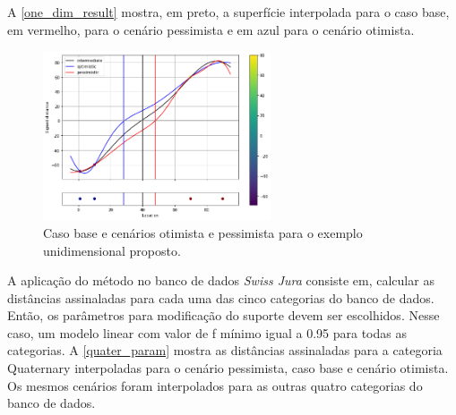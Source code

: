 A \autoref{one_dim_result} mostra, em preto, a superfície interpolada para o caso base, em vermelho, para o cenário pessimista e em azul para o cenário otimista. 
 
\begin{figure}[H]
	\caption{\label{one_dim_result} Caso base e cenários otimista e pessimista para o exemplo unidimensional proposto.}
	\centering
		\includegraphics[width=0.6\textwidth]{capitulo_3/imagens/all_kernels.png}
\end{figure}

A aplicação do método no banco de dados \textit{Swiss Jura} consiste em, calcular as distâncias assinaladas para cada uma das cinco categorias do banco de dados. Então, os parâmetros para modificação do suporte devem ser escolhidos. Nesse caso, um modelo linear com valor de f mínimo igual a 0.95 para todas as categorias. A \autoref{quater_param} mostra as distâncias assinaladas para a categoria Quaternary interpoladas para o cenário pessimista, caso base e cenário otimista. Os mesmos cenários foram interpolados para as outras quatro categorias do banco de dados.

